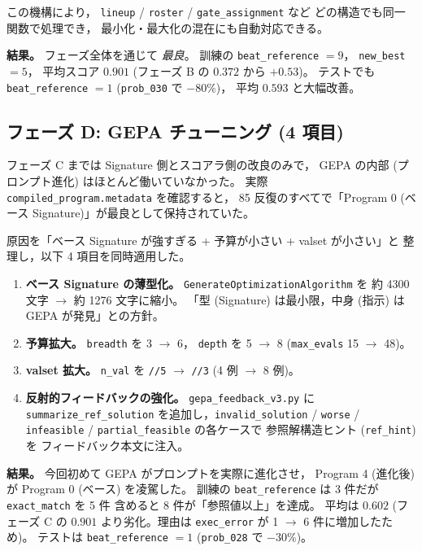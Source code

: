 \documentclass[uplatex,dvipdfmx,a4paper,11pt]{jsarticle}
\begin{document}
この機構により，
\texttt{lineup} / \texttt{roster} / \texttt{gate\_assignment} など
どの構造でも同一関数で処理でき，
最小化・最大化の混在にも自動対応できる。

\textbf{結果。} フェーズ全体を通じて \emph{最良}。
訓練の \texttt{beat\_reference} $= 9$，
\texttt{new\_best} $= 5$，
平均スコア $0.901$ (フェーズ B の $0.372$ から $+0.53$)。
テストでも \texttt{beat\_reference} $= 1$ (\texttt{prob\_030} で $-80\%$)，
平均 $0.593$ と大幅改善。

\subsection{フェーズ D: GEPA チューニング (4 項目)}

フェーズ C までは Signature 側とスコアラ側の改良のみで，
GEPA の内部 (プロンプト進化) はほとんど働いていなかった。
実際 \texttt{compiled\_program.metadata} を確認すると，
85 反復のすべてで「Program 0 (ベース Signature)」が最良として保持されていた。

原因を「ベース Signature が強すぎる + 予算が小さい + valset が小さい」と
整理し，以下 4 項目を同時適用した。

\begin{enumerate}
  \item \textbf{ベース Signature の薄型化。}
    \texttt{GenerateOptimizationAlgorithm} を
    約 4300 文字 $\rightarrow$ 約 1276 文字に縮小。
    「型 (Signature) は最小限，中身 (指示) は GEPA が発見」との方針。
  \item \textbf{予算拡大。}
    \texttt{breadth} を 3 $\rightarrow$ 6，
    \texttt{depth} を 5 $\rightarrow$ 8 (\texttt{max\_evals} 15 $\rightarrow$ 48)。
  \item \textbf{valset 拡大。}
    \texttt{n\_val} を \texttt{//5} $\rightarrow$ \texttt{//3}
    (4 例 $\rightarrow$ 8 例)。
  \item \textbf{反射的フィードバックの強化。}
    \texttt{gepa\_feedback\_v3.py} に \texttt{summarize\_ref\_solution}
    を追加し，\texttt{invalid\_solution} / \texttt{worse}
    / \texttt{infeasible} / \texttt{partial\_feasible} の各ケースで
    参照解構造ヒント (\texttt{ref\_hint}) を
    フィードバック本文に注入。
\end{enumerate}

\textbf{結果。}
今回初めて GEPA がプロンプトを実際に進化させ，
Program 4 (進化後) が Program 0 (ベース) を凌駕した。
訓練の \texttt{beat\_reference} は 3 件だが \texttt{exact\_match} を 5 件
含めると 8 件が「参照値以上」を達成。
平均は $0.602$ (フェーズ C の $0.901$ より劣化。理由は
\texttt{exec\_error} が 1 $\rightarrow$ 6 件に増加したため)。
テストは \texttt{beat\_reference} $= 1$ (\texttt{prob\_028} で $-30\%$)。
\end{document}
